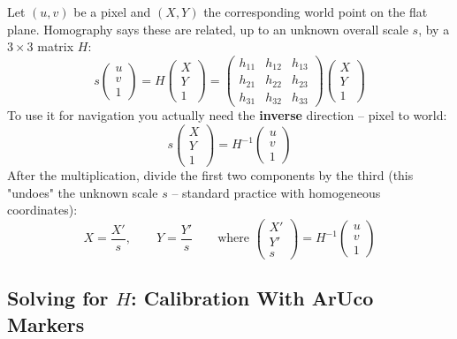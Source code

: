 \documentclass[11pt,a4paper]{article}
\begin{document}
\begin{mathbox}[title={\textbf{The homography equation}}]
Let $(u,v)$ be a pixel and $(X,Y)$ the corresponding world point on the flat plane. Homography
says these are related, up to an unknown overall scale $s$, by a $3\times3$ matrix $H$:
\[
s\begin{pmatrix} u \\ v \\ 1 \end{pmatrix} =
H \begin{pmatrix} X \\ Y \\ 1 \end{pmatrix}
=
\begin{pmatrix} h_{11} & h_{12} & h_{13} \\ h_{21} & h_{22} & h_{23} \\ h_{31} & h_{32} & h_{33} \end{pmatrix}
\begin{pmatrix} X \\ Y \\ 1 \end{pmatrix}
\]
To use it for navigation you actually need the \textbf{inverse} direction -- pixel to world:
\[
s\begin{pmatrix} X \\ Y \\ 1 \end{pmatrix} = H^{-1} \begin{pmatrix} u \\ v \\ 1 \end{pmatrix}
\]
After the multiplication, divide the first two components by the third (this "undoes" the
unknown scale $s$ -- standard practice with homogeneous coordinates):
\[
X = \frac{X'}{s}, \qquad Y = \frac{Y'}{s} \qquad \text{where } \begin{pmatrix}X'\\Y'\\s\end{pmatrix} = H^{-1}\begin{pmatrix}u\\v\\1\end{pmatrix}
\]
\end{mathbox}

\subsection{Solving for $H$: Calibration With ArUco Markers}
\end{document}
